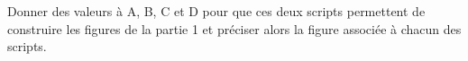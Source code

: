 \documentclass[exercice]{thedocument}%
\begin{document}
\small{\begin{scratch}
\end{scratch}}\par\medskip
Donner des valeurs à A, B, C et D pour que ces deux scripts permettent de construire les figures
de la partie 1 et préciser alors la figure associée à chacun des scripts.
\showthesource
\end{document}

